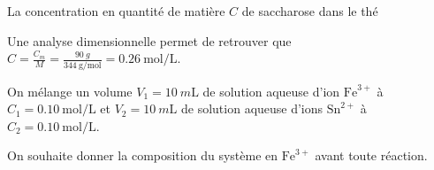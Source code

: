 

\begin{enonce}
La concentration en quantité de matière $C$ de saccharose dans le thé
\end{enonce}


\begin{corrige}
Une analyse dimensionnelle permet de retrouver que $C=\frac{C_m}{M}=\frac{\SI{90}{g}}{\SI{344}{\gram\per\mol}}=\SI{0,26}{\mol\per\liter}$.
\end{corrige}

\finEntrainement







\hauteurLargeurCadreReponse		{7mm}{4cm}
\initialisationEntrainement

\debutEntrainement
On mélange un volume $V_1=\SI{10}{m\liter}$ de solution aqueuse d’ion $\textrm{Fe}^{3+}$ à $C_1=\SI{0,10}{\mole\per\liter}$ et $V_2=\SI{10}{m\liter}$ de solution aqueuse d’ions $\textrm{Sn}^{2+}$ à $C_2=\SI{0,10}{\mole\per\liter}$. 

On souhaite donner la composition du système en $\textrm{Fe}^{3+}$ avant toute réaction.

